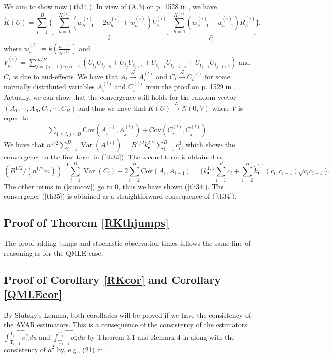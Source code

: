 \documentclass[11pt]{article}
\numberwithin{equation}{section}
\newcommand{\Tau}{\mathrm{T}}
\newcommand{\var}{\operatorname{Var}}
\theoremstyle{plain}
\theoremstyle{remark}
\begin{document}
\smallskip
We aim to show now (\ref{th34}). In view of (A.3) on p. 1528 in \cite{barndorff2008designing}, we have 
$$\tilde{K} (U) = \sum_{i=1}^{B} \Big\{ \underbrace{- \sum_{h=1}^{H^{(i)}} (w_{h+1}^{(i)} - 2 w_{h}^{(i)} + w_{h-1}^{(i)} ) V_h^{(i)}}_{A_i} \underbrace{- \sum_{h=1}^{H^{(i)}} (w_{h+1}^{(i)} - w_{h-1}^{(i)}) R_h^{(i)}}_{C_i} \Big\},$$
where $w_h^{(i)} = k (\frac{h-1}{H^{(i)}})$ and $V_h^{(i)} = \sum_{j=(i-1) n/B + 1 }^{in/B} (U_{t_{j}} U_{t_{j-h}} +  U_{t_j} U_{t_{j+h}} + U_{t_{j-1}} U_{t_{j-1-h}} + U_{t_{j-1}} U_{t_{j-1+h}})$ and $C_i$ is due to end-effects. We have that $A_i \overset{\mathcal{L}}{\rightarrow} A_i^{(l)}$ and  $C_i \overset{\mathcal{L}}{\rightarrow} C_i^{(l)}$ for some normally distributed variables $A_i^{(l)}$ and $C_i^{(l)}$ from the proof on p. 1529 in \cite{barndorff2008designing}. Actually, we can show that the convergence still holds for the random vector $(A_1, \cdots, A_B, C_1, \cdots, C_B)$ and thus we have that $\tilde{K} (U) \overset{\mathcal{L}}{\rightarrow} N(0,V)$ where $V$ is equal to 
\begin{eqnarray}
\label{sumcov}
\sum_{1 \leq i,j \leq B} \mathrm{Cov} (A_i^{(l)}, A_j^{(l)}) + \mathrm{Cov} (C_i^{(l)}, C_j^{(l)}).
\end{eqnarray}
 We have that $n^{1/2} \sum_{i=1}^{B} \var (A^{(i)}) = B^{1/2} k_{\bullet}^{2,2} \sum_{i=1}^{B} c_i^{3}$, which shows the convergence to the first term in (\ref{th34}). The second term is obtained as 
$$(B^{1/2}/(n^{1/2} m))^{-1} \sum_{i=1}^B \var (C_i) + 2 \sum_{i=2}^B \mathrm{Cov} (A_i, A_{i-1}) = \big\{k_{\bullet}^{1,1} \sum_{i=1}^{B} c_i + \sum_{i=2}^{B} \tilde{k}_{\bullet}^{1,1} (c_i, c_{i-1}) \sqrt{c_i c_{i-1}} \big\}.$$
The other terms in (\ref{sumcov}) go to 0, thus we have shown (\ref{th34}). The convergence (\ref{th35}) is obtained as a straightforward consequence of (\ref{th34}).

\subsection{Proof of Theorem \ref{RKthjumps}}
The proof adding jumps and stochastic observation times follows the same line of reasoning as for the QMLE case.

\subsection{Proof of Corollary \ref{RKcor} and Corollary \ref{QMLEcor}}
By Slutsky's Lemma, both corollaries will be proved if we have the consistency of the AVAR estimators. This is a consequence of the consistency of the estimators $\widehat{\int_{\Tau_{i-1}}^{\Tau_i} \sigma_u^2 du}$ and $\widehat{\int_{\Tau_{i-1}}^{\Tau_i} \sigma_u^4 du}$ by Theorem 3.1 and Remark 4 in \cite{jacod2009microstructure} along with the consistency of $\widehat{a}^2$ by, e.g., (21) in \cite{zhang2005tale}. 
\end{document}
